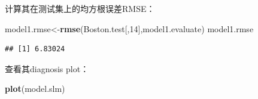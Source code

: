 \documentclass[UTF-8]{ctexart}
\newenvironment{Shaded}{\begin{snugshade}}{\end{snugshade}}
\newcommand{\DecValTok}[1]{\textcolor[rgb]{0.00,0.00,0.81}{#1}}
\newcommand{\KeywordTok}[1]{\textcolor[rgb]{0.13,0.29,0.53}{\textbf{#1}}}
\newcommand{\NormalTok}[1]{#1}
\begin{document}
计算其在测试集上的均方根误差RMSE：
\begin{Shaded}
	\begin{Highlighting}[]
\NormalTok{model1.rmse<-}\KeywordTok{rmse}\NormalTok{(Boston.test[,}\DecValTok{14}\NormalTok{],model1.evaluate)}
\NormalTok{model1.rmse}
	\end{Highlighting}
\end{Shaded}

\begin{verbatim}
## [1] 6.83024
\end{verbatim}

查看其diagnosis plot：

\begin{Shaded}
	\begin{Highlighting}[]
\KeywordTok{plot}\NormalTok{(model.slm)}
	\end{Highlighting}
\end{Shaded}
\end{document}

